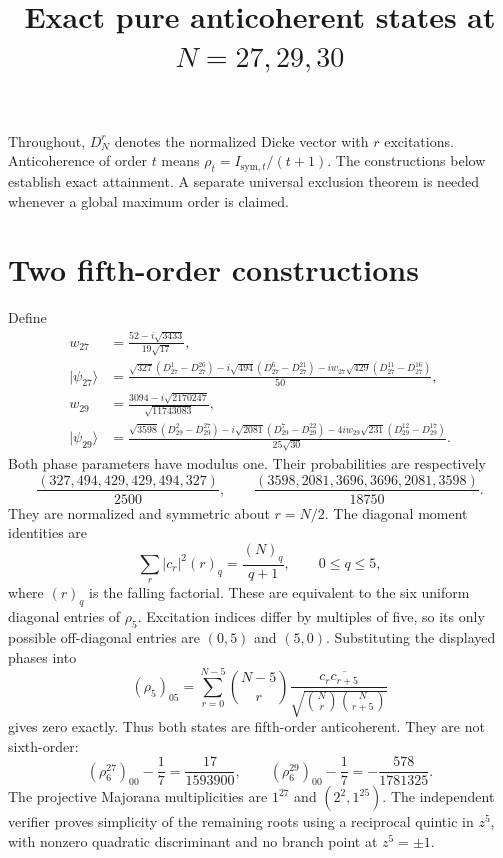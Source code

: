 \documentclass[11pt]{article}
\begin{document}
\title{Exact pure anticoherent states at $N=27,29,30$}\author{}\date{}\maketitle
Throughout, $D_N^r$ denotes the normalized Dicke vector with $r$ excitations.
Anticoherence of order $t$ means $\rho_t=I_{\mathrm{sym},t}/(t+1)$.
The constructions below establish exact attainment. A separate universal
exclusion theorem is needed whenever a global maximum order is claimed.

\section*{Two fifth-order constructions}
Define
\begin{align*}
w_{27}&=\frac{52-i\sqrt{3433}}{19\sqrt{17}},\\
|\psi_{27}\rangle&=\frac{\sqrt{327}(D_{27}^1-D_{27}^{26})
-i\sqrt{494}(D_{27}^6-D_{27}^{21})
-iw_{27}\sqrt{429}(D_{27}^{11}-D_{27}^{16})}{50},\\
w_{29}&=\frac{3094-i\sqrt{2170247}}{\sqrt{11743083}},\\
|\psi_{29}\rangle&=\frac{\sqrt{3598}(D_{29}^2-D_{29}^{27})
-i\sqrt{2081}(D_{29}^7-D_{29}^{22})
-4iw_{29}\sqrt{231}(D_{29}^{12}-D_{29}^{17})}{25\sqrt{30}}.
\end{align*}
Both phase parameters have modulus one. Their probabilities are respectively
\[
\frac{(327,494,429,429,494,327)}{2500},\qquad
\frac{(3598,2081,3696,3696,2081,3598)}{18750}.
\]
They are normalized and symmetric about $r=N/2$. The diagonal moment
identities are
\[
\sum_r |c_r|^2 (r)_q=\frac{(N)_q}{q+1},\qquad 0\le q\le5,
\]
where $(r)_q$ is the falling factorial. These are equivalent to the six
uniform diagonal entries of $\rho_5$. Excitation indices differ by multiples
of five, so its only possible off-diagonal entries are $(0,5)$ and $(5,0)$.
Substituting the displayed phases into
\[
(\rho_5)_{05}=\sum_{r=0}^{N-5}\binom{N-5}{r}
\frac{c_r\overline{c_{r+5}}}{\sqrt{\binom Nr\binom N{r+5}}}
\]
gives zero exactly. Thus both states are fifth-order anticoherent.
They are not sixth-order:
\[
(\rho_6^{27})_{00}-\frac17=\frac{17}{1593900},\qquad
(\rho_6^{29})_{00}-\frac17=-\frac{578}{1781325}.
\]
The projective Majorana multiplicities are $1^{27}$ and $(2^2,1^{25})$.
The independent verifier proves simplicity of the remaining roots using a
reciprocal quintic in $z^5$, with nonzero quadratic discriminant and no
branch point at $z^5=\pm1$.
\end{document}
